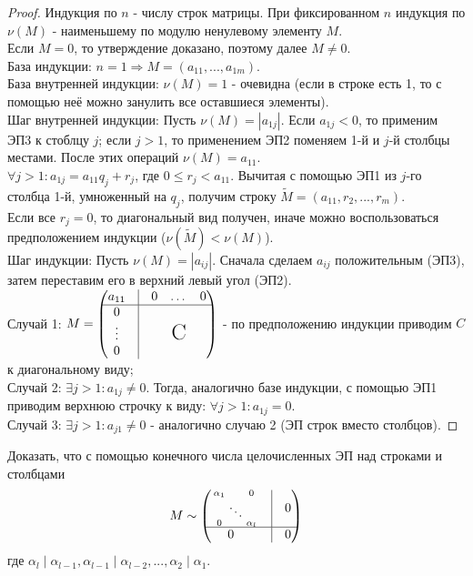 \begin{proof}
    Индукция по $n$ - числу строк матрицы.
    При фиксированном $n$ индукция по $\nu(M)$ - наименьшему по модулю ненулевому элементу $M$. \\
    Если $M=0$, то утверждение доказано, поэтому далее $M \neq 0$.\\
    База индукции: $n=1 \Longrightarrow M = (a_{11},...,a_{1m})$.\\
    \tab База внутренней индукции: $\nu(M) = 1$ - очевидна (если в строке есть 1, то с помощью неё можно занулить все оставшиеся элементы).\\
    \tab Шаг внутренней индукции: Пусть $\nu(M) = |a_{1j}|$. Если $a_{1j} < 0$, то применим ЭП3 к стоблцу $j$; если $j > 1$, то применением ЭП2 поменяем 1-й и $j$-й столбцы местами. После этих операций $\nu(M) = a_{11}$.\\
    $\forall j > 1: a_{1j} = a_{11}q_j + r_j$, где $0 \leqslant r_j < a_{11}$. Вычитая с помощью ЭП1 из $j$-го столбца 1-й, умноженный на $q_j$, получим строку $\tilde{M} = (a_{11}, r_2,...,r_m)$.\\
    Если все $r_j = 0$, то диагональный вид получен, иначе можно воспользоваться предположением индукции ($\nu(\tilde{M}) < \nu(M)$).\\
    Шаг индукции: Пусть $\nu(M) = |a_{ij}|$. Сначала сделаем $a_{ij}$ положительным (ЭП3), затем переставим его в верхний левый угол (ЭП2).\\
    \tab Случай 1: $M = \begin{pmatrix} a_{11}&\vline&0&\dots&0\\ \hline 0&\vline \\ \vdots&\vline&&\text{\LARGE{C}}  \\ 0 & \vline \end{pmatrix}$ - по предположению индукции приводим $C$ к диагональному виду;\\
    \tab Случай 2: $\exists j > 1: a_{1j} \neq 0$. Тогда, аналогично базе индукции, с помощью ЭП1 приводим верхнюю строчку к виду: $\forall j > 1: a_{1j} = 0$.\\
    \tab Случай 3: $\exists j > 1: a_{j1} \neq 0$ - аналогично случаю 2 (ЭП строк вместо столбцов). 
\end{proof}
\begin{exercise}
    Доказать, что с помощью конечного числа целочисленных ЭП над строками и столбцами \[M \sim \begin{pmatrix}
      \begin{smallmatrix}
    \alpha_1&&0\\ &\ddots&\\ 0&&\alpha_l
    \end{smallmatrix}  & \vline  & 0\\
     \hline
       0  \ \ & \vline& 0\\

    \end{pmatrix}\] 
    где $\alpha_l \mid \alpha_{l-1}, \alpha_{l-1} \mid \alpha_{l-2}, ..., \alpha_2 \mid \alpha_1$.
\end{exercise}
